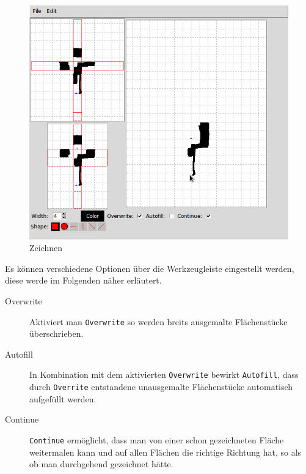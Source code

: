 \begin{figure}[htbp]
  \centering
  \includegraphics[scale=0.5]{03_pics/zeichnen.png}
  \caption{Zeichnen}
  \label{fig:zeichnen}
\end{figure}

Es können verschiedene Optionen über die Werkzeugleiste eingestellt werden, diese werde im Folgenden näher erläutert.

\begin{description}
  \item [Overwrite] Aktiviert man \texttt{Overwrite} so werden breits ausgemalte Flächenstücke überschrieben.

  \item [Autofill] In Kombination mit dem aktivierten \texttt{Overwrite} bewirkt \texttt{Autofill}, dass durch \texttt{Overrite} entstandene unausgemalte Flächenstücke automatisch aufgefüllt werden.

  \item [Continue] \texttt{Continue} ermöglicht, dass man von einer schon gezeichneten Fläche weitermalen kann und auf allen Flächen die richtige Richtung hat, so als ob man durchgehend gezeichnet hätte.
\end{description}


